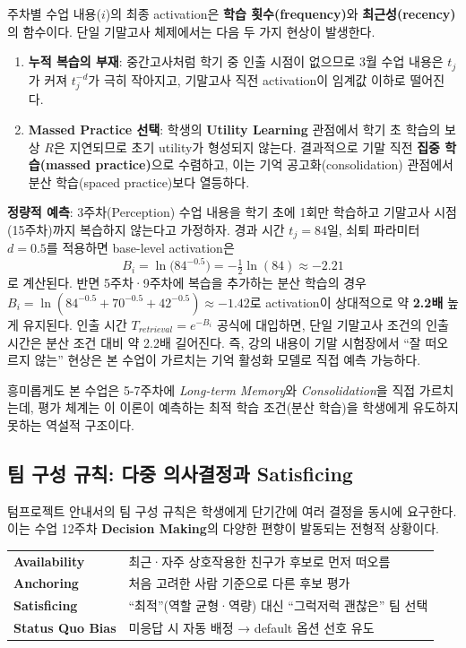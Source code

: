 \documentclass[a4paper,11pt]{article}
\begin{document}
\noindent
주차별 수업 내용($i$)의 최종 activation은 \textbf{학습 횟수(frequency)}와
\textbf{최근성(recency)}의 함수이다. 단일 기말고사 체제에서는 다음 두 가지 현상이 발생한다.

\begin{enumerate}[leftmargin=1.5em, itemsep=1pt]
  \item \textbf{누적 복습의 부재}: 중간고사처럼 학기 중 인출 시점이 없으므로
        3월 수업 내용은 $t_j$가 커져 $t_j^{-d}$가 극히 작아지고, 기말고사 직전
        activation이 임계값 이하로 떨어진다.
  \item \textbf{Massed Practice 선택}: 학생의 \textbf{Utility Learning} 관점에서
        학기 초 학습의 보상 $R$은 지연되므로 초기 utility가 형성되지 않는다.
        결과적으로 기말 직전 \textbf{집중 학습(massed practice)}으로 수렴하고,
        이는 기억 공고화(consolidation) 관점에서 분산 학습(spaced practice)보다
        열등하다.
\end{enumerate}

\vspace{2pt}
\noindent
\textbf{정량적 예측}: 3주차(Perception) 수업 내용을 학기 초에 1회만 학습하고
기말고사 시점(15주차)까지 복습하지 않는다고 가정하자. 경과 시간 $t_j = 84$일, 쇠퇴
파라미터 $d = 0.5$를 적용하면 base-level activation은
\[
  B_i = \ln\!\bigl(84^{-0.5}\bigr) = -\tfrac{1}{2}\ln(84) \approx -2.21
\]
로 계산된다. 반면 5주차·9주차에 복습을 추가하는 분산 학습의 경우
$B_i = \ln(84^{-0.5} + 70^{-0.5} + 42^{-0.5}) \approx -1.42$로 activation이
상대적으로 약 \textbf{2.2배} 높게 유지된다. 인출 시간 $T_{retrieval} = e^{-B_i}$ 공식에
대입하면, 단일 기말고사 조건의 인출 시간은 분산 조건 대비 약 2.2배 길어진다.
즉, 강의 내용이 기말 시험장에서 ``잘 떠오르지 않는'' 현상은 본 수업이 가르치는
기억 활성화 모델로 직접 예측 가능하다.

흥미롭게도 본 수업은 5-7주차에 \textit{Long-term Memory}와 \textit{Consolidation}을
직접 가르치는데, 평가 체계는 이 이론이 예측하는 최적 학습 조건(분산 학습)을 학생에게
유도하지 못하는 역설적 구조이다.

\subsection{팀 구성 규칙: 다중 의사결정과 Satisficing}

텀프로젝트 안내서의 팀 구성 규칙은 학생에게 단기간에 여러 결정을 동시에 요구한다.
이는 수업 12주차 \textbf{Decision Making}의 다양한 편향이 발동되는 전형적 상황이다.

\begin{tcolorbox}[mybox=mainblue, title={Decision Making 편향}]
\begin{tabularx}{\linewidth}{@{}p{3.2cm}X@{}}
\textbf{Availability} & 최근·자주 상호작용한 친구가 후보로 먼저 떠오름 \\[2pt]
\textbf{Anchoring} & 처음 고려한 사람 기준으로 다른 후보 평가 \\[2pt]
\textbf{Satisficing} & ``최적''(역할 균형·역량) 대신 ``그럭저럭 괜찮은'' 팀 선택 \\[2pt]
\textbf{Status Quo Bias} & 미응답 시 자동 배정 → default 옵션 선호 유도 \\
\end{tabularx}
\end{tcolorbox}
\end{document}
